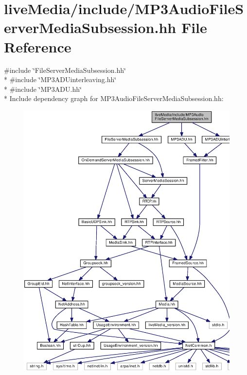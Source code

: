 \section{live\+Media/include/\+M\+P3\+Audio\+File\+Server\+Media\+Subsession.hh File Reference}
\label{MP3AudioFileServerMediaSubsession_8hh}
{\ttfamily \#include \char`\"{}File\+Server\+Media\+Subsession.\+hh\char`\"{}}\\*
{\ttfamily \#include \char`\"{}M\+P3\+A\+D\+Uinterleaving.\+hh\char`\"{}}\\*
{\ttfamily \#include \char`\"{}M\+P3\+A\+D\+U.\+hh\char`\"{}}\\*
Include dependency graph for M\+P3\+Audio\+File\+Server\+Media\+Subsession.\+hh\+:
\nopagebreak
\begin{figure}[H]
\begin{center}
\leavevmode
\includegraphics[width=350pt]{MP3AudioFileServerMediaSubsession_8hh__incl}
\end{center}
\end{figure}
